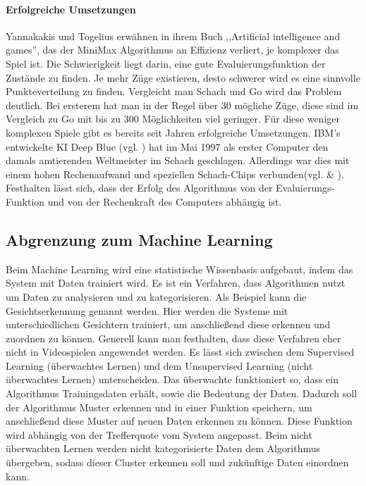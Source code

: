 \paragraph{Erfolgreiche Umsetzungen}
Yannakakis und Togelius erwähnen in ihrem Buch ,,Artificial intelligence and games'', das der MiniMax Algorithmus an Effizienz verliert, je komplexer das Spiel ist. Die Schwierigkeit liegt darin, eine gute Evaluierungsfunktion der Zustände zu finden\cite{yannakakis2018artificial}. Je mehr Züge existieren, desto schwerer wird es eine sinnvolle Punkteverteilung zu finden. Vergleicht man Schach und Go wird das Problem deutlich. Bei ersterem hat man in der Regel über 30 mögliche Züge, diese sind im Vergleich zu Go mit bis zu 300 Möglichkeiten viel geringer. Für diese weniger komplexen Spiele gibt es bereits seit Jahren erfolgreiche Umsetzungen. IBM's entwickelte KI Deep Blue (vgl. \cite{DBLP:journals/micro/Hsu99}) hat im Mai 1997 als erster Computer den damals amtierenden Weltmeister im Schach geschlagen\cite{DBLP:journals/cse/Hsu06}. Allerdings war dies mit einem hohen Rechenaufwand und speziellen Schach-Chips verbunden(vgl. \cite{DBLP:journals/micro/Hsu99} \& \cite{DBLP:journals/cse/Hsu06}).
Festhalten lässt sich, dass der Erfolg des Algorithmus von der Evaluierungs-Funktion und von der Rechenkraft des Computers abhängig ist.

\subsection{Abgrenzung zum Machine Learning}
\label{ch:Grundlagen:sec:Learning}
Beim Machine Learning wird eine statistische Wissenbasis aufgebaut, indem das System mit Daten trainiert wird. Es ist ein Verfahren, dass Algorithmen nutzt um Daten zu analysieren und zu kategorisieren. Als Beispiel kann die Gesichtserkennung genannt werden. Hier werden die Systeme mit unterschiedlichen Gesichtern trainiert, um anschließend diese erkennen und zuordnen zu können. Generell kann man festhalten, dass diese Verfahren eher nicht in Videospielen angewendet werden. Es lässt sich zwischen dem Supervised Learning (überwachtes Lernen) und dem Unsupervised Learning (nicht überwachtes Lernen) unterscheiden.
Das überwachte funktioniert so, dass ein Algorithmus Trainingsdaten erhält, sowie die Bedeutung der Daten. Dadurch soll der Algorithmus Muster erkennen und in einer Funktion speichern, um anschließend diese Muster auf neuen Daten erkennen zu können. Diese Funktion wird abhängig von der Trefferquote vom System angepasst.
Beim nicht überwachten Lernen werden nicht kategorisierte Daten dem Algorithmus übergeben, sodass dieser Cluster erkennen soll und zukünftige Daten einordnen kann.\\

